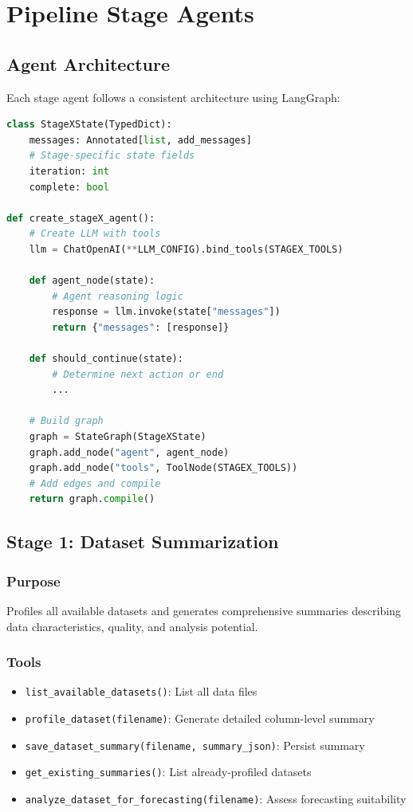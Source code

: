 \documentclass[12pt,a4paper]{report}
\begin{document}
\chapter{Pipeline Stage Agents}

\section{Agent Architecture}
Each stage agent follows a consistent architecture using LangGraph:

\begin{lstlisting}[language=Python]
class StageXState(TypedDict):
    messages: Annotated[list, add_messages]
    # Stage-specific state fields
    iteration: int
    complete: bool

def create_stageX_agent():
    # Create LLM with tools
    llm = ChatOpenAI(**LLM_CONFIG).bind_tools(STAGEX_TOOLS)
    
    def agent_node(state):
        # Agent reasoning logic
        response = llm.invoke(state["messages"])
        return {"messages": [response]}
    
    def should_continue(state):
        # Determine next action or end
        ...
    
    # Build graph
    graph = StateGraph(StageXState)
    graph.add_node("agent", agent_node)
    graph.add_node("tools", ToolNode(STAGEX_TOOLS))
    # Add edges and compile
    return graph.compile()
\end{lstlisting}

\section{Stage 1: Dataset Summarization}
\subsection{Purpose}
Profiles all available datasets and generates comprehensive summaries describing data characteristics, quality, and analysis potential.

\subsection{Tools}
\begin{itemize}
    \item \texttt{list\_available\_datasets()}: List all data files
    \item \texttt{profile\_dataset(filename)}: Generate detailed column-level summary
    \item \texttt{save\_dataset\_summary(filename, summary\_json)}: Persist summary
    \item \texttt{get\_existing\_summaries()}: List already-profiled datasets
    \item \texttt{analyze\_dataset\_for\_forecasting(filename)}: Assess forecasting suitability
\end{itemize}
\end{document}
